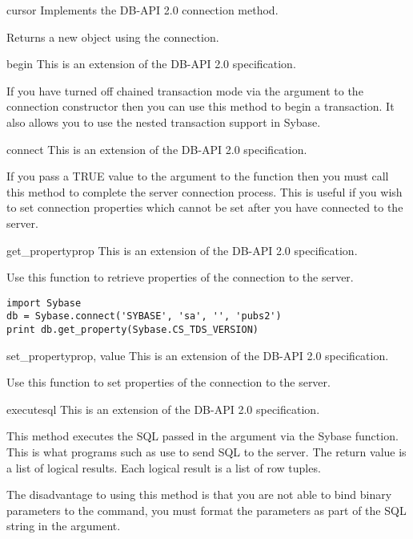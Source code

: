 \begin{methoddesc}[Connection]{cursor}{}
Implements the DB-API 2.0 connection  method.

Returns a new  object using the connection.
\end{methoddesc}

\begin{methoddesc}[Connection]{begin}{}
This is an extension of the DB-API 2.0 specification.

If you have turned off chained transaction mode via the
 argument to the connection constructor then you can
use this method to begin a transaction.  It also allows you to use the
nested transaction support in Sybase.
\end{methoddesc}

\begin{methoddesc}[Connection]{connect}{}
This is an extension of the DB-API 2.0 specification.

If you pass a TRUE value to the  argument to the
 function then you must call this method to
complete the server connection process.  This is useful if you wish to
set connection properties which cannot be set after you have connected
to the server.
\end{methoddesc}

\begin{methoddesc}[Connection]{get_property}{prop}
This is an extension of the DB-API 2.0 specification.

Use this function to retrieve properties of the connection to the
server.

\begin{verbatim}
import Sybase
db = Sybase.connect('SYBASE', 'sa', '', 'pubs2')
print db.get_property(Sybase.CS_TDS_VERSION)
\end{verbatim}
\end{methoddesc}

\begin{methoddesc}[Connection]{set_property}{prop, value}
This is an extension of the DB-API 2.0 specification.

Use this function to set properties of the connection to the server.
\end{methoddesc}

\begin{methoddesc}[Connection]{execute}{sql}
This is an extension of the DB-API 2.0 specification.

This method executes the SQL passed in the  argument via the
 Sybase function.  This is what
programs such as  use to send SQL to the server.  The
return value is a list of logical results.  Each logical result is a
list of row tuples.

The disadvantage to using this method is that you are not able to bind
binary parameters to the command, you must format the parameters as
part of the SQL string in the  argument.
\end{methoddesc}

